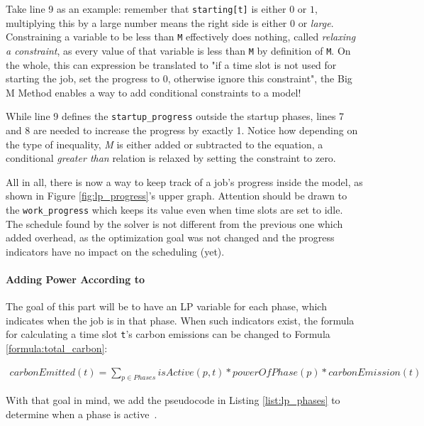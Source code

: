Take line 9 as an example: 
remember that \verb|starting[t]| is either $0$ or $1$, multiplying this by a large number means the right side is either $0$ or \emph{large}. 
Constraining a variable to be less than \verb|M| effectively does nothing, called \emph{relaxing a constraint}, as every value of that variable is less than \verb|M| by definition of \verb|M|. 
On the whole, this can expression be translated to "if a time slot is not used for starting the job, set the progress to 0, otherwise ignore this constraint", the Big M Method enables a way to add conditional constraints to a model!

While line 9 defines the \verb|startup_progress| outside the startup phases, lines 7 and 8 are needed to increase the progress by exactly 1. 
Notice how depending on the type of inequality, \emph{M} is either added or subtracted to the equation, a conditional \emph{greater than} relation is relaxed by setting the constraint to zero.

All in all, there is now a way to keep track of a job's progress inside the model, as shown in Figure \ref{fig:lp_progress}'s upper graph. Attention should be drawn to the \verb|work_progress| which keeps its value even when time slots are set to idle. 
The schedule found by the solver is not different from the previous one which added overhead, as the optimization goal was not changed and the progress indicators have no impact on the scheduling (yet).

\newpage
\paragraph{Adding Power According to \modelname}

The goal of this part will be to have an LP variable for each phase, which indicates when the job is in that phase.
When such indicators exist, the formula for calculating a time slot \verb|t|'s carbon emissions can be changed to Formula \ref{formula:total_carbon}:

\begin{align}
    \label{formula:total_carbon}
    carbonEmitted(t) = \sum_{p \in Phases} isActive(p, t) * powerOfPhase(p) * carbonEmission(t)
\end{align}

With that goal in mind, we add the pseudocode in Listing \ref{list:lp_phases} to determine when a phase is active~.

